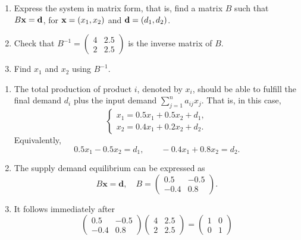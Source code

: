 \documentclass[11pt]{exam}
\begin{document}
\begin{questions}
\begin{enumerate}[leftmargin = 0.5cm, label = (\alph*), rightmargin = 0.2cm]
            \item Express the system in matrix form, that is, find a matrix $B$ such that $B{\bf x} = {\bf d}$, for ${\bf x} = (x_1, x_2)$ and ${\bf d} =(d_1, d_2)$.

            \item Check that $B^{-1} = 
            \begin{pmatrix}
                4 & 2.5 \\
                2 & 2.5 
            \end{pmatrix}$ is the inverse matrix of $B$.

            \item Find $x_1$ and $x_2$ using $B^{-1}$. 
        
        \end{enumerate}
    
\begin{solution}
\begin{enumerate}[leftmargin=0.55cm, label=(\alph*), rightmargin=0.2cm]

\item The total production of product $i$, denoted by $x_i$, should be able to fulfill the final demand $d_i$ plus the input demand $\sum_{j=1}^n a_{ij}x_j$. That is, in this case,
\[
\begin{cases}
x_1 = 0.5x_1 + 0.5x_2 + d_1,\\
x_2 = 0.4x_1 + 0.2x_2 + d_2.
\end{cases}
\]
Equivalently,
\[
0.5x_1 - 0.5x_2 = d_1,\qquad -0.4x_1 + 0.8x_2 = d_2.
\]

\item The supply demand equilibrium can be expressed as
\[
B\mathbf{x}=\mathbf{d},\quad
B=\begin{pmatrix}
0.5 & -0.5\\
-0.4 & 0.8
\end{pmatrix}.
\]

\item
It follows immediately after
\[
\begin{pmatrix}
0.5 & -0.5\\
-0.4 & 0.8
\end{pmatrix}
\begin{pmatrix}
4 & 2.5 \\
2 & 2.5 
\end{pmatrix}
=
\begin{pmatrix}
1 & 0 \\
0 & 1 
\end{pmatrix}
\]


\end{enumerate}
\end{solution}
\end{questions}
\end{document}
